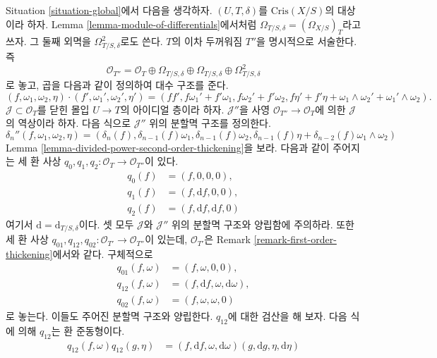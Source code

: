 \begin{remark}
\label{remark-second-order-thickening}
Situation \ref{situation-global}에서 다음을 생각하자.
$(U, T, \delta)$를 $\text{Cris}(X/S)$의 대상이라 하자.
Lemma \ref{lemma-module-of-differentials}에서처럼
$\Omega_{T/S, \delta} = (\Omega_{X/S})_T$라고 쓰자.
그 둘째 외멱을 $\Omega^2_{T/S, \delta}$로도 쓴다.
$T$의 이차 두꺼워짐 $T''$을 명시적으로 서술한다. 즉
$$
\mathcal{O}_{T''} =
\mathcal{O}_T \oplus \Omega_{T/S, \delta} \oplus \Omega_{T/S, \delta}
\oplus \Omega^2_{T/S, \delta}
$$
로 놓고, 곱을 다음과 같이 정의하여 대수 구조를 준다.
$$
(f, \omega_1, \omega_2, \eta) \cdot
(f', \omega_1', \omega_2', \eta') =
(ff', f\omega_1' + f'\omega_1, f\omega_2' + f'\omega_2,
f\eta' + f'\eta + \omega_1 \wedge \omega_2' + \omega_1' \wedge \omega_2).
$$
$\mathcal{J} \subset \mathcal{O}_T$를 닫힌 몰입 $U \to T$의
아이디얼 층이라 하자. $\mathcal{J}''$을 사영
$\mathcal{O}_{T''} \to \mathcal{O}_T$에 의한 $\mathcal{J}$의
역상이라 하자. 다음 식으로 $\mathcal{J}''$ 위의 분할멱 구조를
정의한다.
$$
\delta_n''(f, \omega_1, \omega_2, \eta) =
(\delta_n(f), \delta_{n - 1}(f)\omega_1, \delta_{n - 1}(f)\omega_2,
\delta_{n - 1}(f)\eta + \delta_{n - 2}(f)\omega_1 \wedge \omega_2)
$$
Lemma \ref{lemma-divided-power-second-order-thickening}을 보라.
다음과 같이 주어지는 세 환 사상
$q_0, q_1, q_2 : \mathcal{O}_T \to \mathcal{O}_{T''}$이 있다.
\begin{align*}
q_0(f) & = (f, 0, 0, 0), \\
q_1(f) & = (f, \text{d}f, 0, 0), \\
q_2(f) & = (f, \text{d}f, \text{d}f, 0)
\end{align*}
여기서 $\text{d} = \text{d}_{T/S, \delta}$이다.
셋 모두 $\mathcal{J}$와 $\mathcal{J}''$ 위의 분할멱 구조와
양립함에 주의하라. 또한 세 환 사상
$q_{01}, q_{12}, q_{02} : \mathcal{O}_{T'} \to \mathcal{O}_{T''}$이
있는데, $\mathcal{O}_{T'}$은 Remark
\ref{remark-first-order-thickening}에서와 같다. 구체적으로
\begin{align*}
q_{01}(f, \omega) & = (f, \omega, 0, 0), \\
q_{12}(f, \omega) & =
(f, \text{d}f, \omega, \text{d}\omega), \\
q_{02}(f, \omega) & = (f, \omega, \omega, 0)
\end{align*}
로 놓는다. 이들도 주어진 분할멱 구조와 양립한다.
$q_{12}$에 대한 검산을 해 보자. 다음 식에 의해 $q_{12}$는
환 준동형이다.
\begin{align*}
q_{12}(f, \omega)q_{12}(g, \eta) & =
(f, \text{d}f, \omega, \text{d}\omega)(g, \text{d}g, \eta, \text{d}\eta) \\

\end{align*}
\end{remark}
